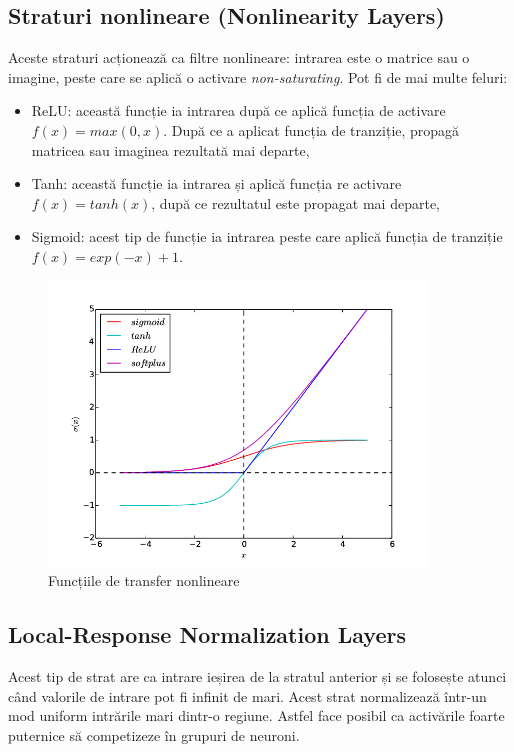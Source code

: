 \subsection{Straturi nonlineare (Nonlinearity Layers)}
Aceste straturi acționează ca filtre nonlineare: intrarea este o matrice sau o imagine, peste care se aplică o activare \textit{non-saturating}. Pot fi de mai multe feluri:
\begin{itemize}
	\item ReLU: această funcție ia intrarea după ce aplică funcția de activare $f(x)=max(0, x)$. După ce a aplicat funcția de tranziție, propagă matricea sau imaginea rezultată mai departe,
	\item Tanh: această funcție ia intrarea și aplică funcția re activare $f(x)=tanh(x)$, după ce rezultatul este propagat mai departe,
	\item Sigmoid: acest tip de funcție ia intrarea peste care aplică funcția de tranziție $f(x)=exp(-x)+1$.
\end{itemize}

\begin{figure}[h!]
    	\centering
	\captionsetup{justification=centering, margin=2cm}
	\includegraphics[width=0.9\textwidth]{figures/nonlinear_activation_functions.png}
	\caption{Funcțiile de transfer nonlineare \cite{non_lin_act_fun}}
	\label{fig:set of Gabor filters}
\end{figure}

\subsection{Local-Response Normalization Layers}
Acest tip de strat are ca intrare ieșirea de la stratul anterior și se folosește atunci când valorile de intrare pot fi infinit de mari. Acest strat normalizează într-un mod uniform intrările mari dintr-o regiune. Astfel face posibil ca activările foarte puternice să competizeze în grupuri de neuroni.

